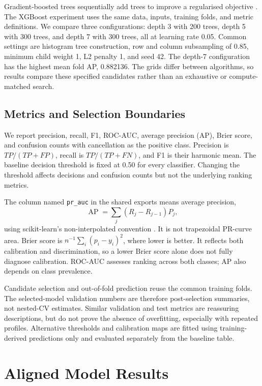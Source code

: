 Gradient-boosted trees sequentially add trees to improve a regularised objective \citep{chen2016}. The XGBoost experiment uses the same data, inputs, training folds, and metric definitions. We compare three configurations: depth 3 with 200 trees, depth 5 with 300 trees, and depth 7 with 300 trees, all at learning rate 0.05. Common settings are histogram tree construction, row and column subsampling of 0.85, minimum child weight 1, L2 penalty 1, and seed 42. The depth-7 configuration has the highest mean fold AP, 0.882136. The grids differ between algorithms, so results compare these specified candidates rather than an exhaustive or compute-matched search.

\subsection{Metrics and Selection Boundaries}
We report precision, recall, F1, ROC-AUC, average precision (AP), Brier score, and confusion counts with cancellation as the positive class. Precision is \(TP/(TP+FP)\), recall is \(TP/(TP+FN)\), and F1 is their harmonic mean. The baseline decision threshold is fixed at 0.50 for every classifier. Changing the threshold affects decisions and confusion counts but not the underlying ranking metrics.

The column named \texttt{pr\_auc} in the shared exports means average precision,
\begin{equation}
 \operatorname{AP}=\sum_j (R_j-R_{j-1})P_j,
\end{equation}
using scikit-learn's non-interpolated convention \citep{sklearnap}. It is not trapezoidal PR-curve area. Brier score is \(n^{-1}\sum_i(p_i-y_i)^2\), where lower is better. It reflects both calibration and discrimination, so a lower Brier score alone does not fully diagnose calibration. ROC-AUC assesses ranking across both classes; AP also depends on class prevalence.

Candidate selection and out-of-fold prediction reuse the common training folds. The selected-model validation numbers are therefore post-selection summaries, not nested-CV estimates. Similar validation and test metrics are reassuring descriptions, but do not prove the absence of overfitting, especially with repeated profiles. Alternative thresholds and calibration maps are fitted using training-derived predictions only and evaluated separately from the baseline table.

\section{Aligned Model Results}


